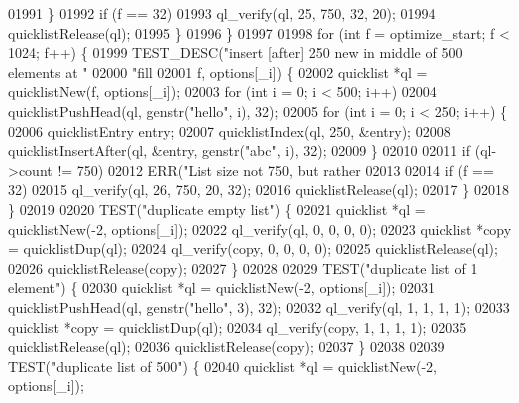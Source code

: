 \begin{DoxyCode}
{{{{{{{{{{{{{{{{{{{{{{{{{{{{{{{{{{{{{{{{{{{{{{{{{{{{{{{{{{01991                 \}
01992                 \textcolor{keywordflow}{if} (f == 32)
01993                     ql\_verify(ql, 25, 750, 32, 20);
01994                 quicklistRelease(ql);
01995             \}
01996         \}
01997 
01998         \textcolor{keywordflow}{for} (\textcolor{keywordtype}{int} f = optimize\_start; f < 1024; f++) \{
01999             TEST\_DESC(\textcolor{stringliteral}{"insert [after] 250 new in middle of 500 elements at "}
02000                       \textcolor{stringliteral}{"fill %
02001                       f, options[\_i]) \{
02002                 quicklist *ql = quicklistNew(f, options[\_i]);
02003                 \textcolor{keywordflow}{for} (\textcolor{keywordtype}{int} i = 0; i < 500; i++)
02004                     quicklistPushHead(ql, genstr(\textcolor{stringliteral}{"hello"}, i), 32);
02005                 \textcolor{keywordflow}{for} (\textcolor{keywordtype}{int} i = 0; i < 250; i++) \{
02006                     quicklistEntry entry;
02007                     quicklistIndex(ql, 250, &entry);
02008                     quicklistInsertAfter(ql, &entry, genstr(\textcolor{stringliteral}{"abc"}, i), 32);
02009                 \}
02010 
02011                 \textcolor{keywordflow}{if} (ql->count != 750)
02012                     ERR(\textcolor{stringliteral}{"List size not 750, but rather %
02013 
02014                 \textcolor{keywordflow}{if} (f == 32)
02015                     ql\_verify(ql, 26, 750, 20, 32);
02016                 quicklistRelease(ql);
02017             \}
02018         \}
02019 
02020         TEST(\textcolor{stringliteral}{"duplicate empty list"}) \{
02021             quicklist *ql = quicklistNew(-2, options[\_i]);
02022             ql\_verify(ql, 0, 0, 0, 0);
02023             quicklist *copy = quicklistDup(ql);
02024             ql\_verify(copy, 0, 0, 0, 0);
02025             quicklistRelease(ql);
02026             quicklistRelease(copy);
02027         \}
02028 
02029         TEST(\textcolor{stringliteral}{"duplicate list of 1 element"}) \{
02030             quicklist *ql = quicklistNew(-2, options[\_i]);
02031             quicklistPushHead(ql, genstr(\textcolor{stringliteral}{"hello"}, 3), 32);
02032             ql\_verify(ql, 1, 1, 1, 1);
02033             quicklist *copy = quicklistDup(ql);
02034             ql\_verify(copy, 1, 1, 1, 1);
02035             quicklistRelease(ql);
02036             quicklistRelease(copy);
02037         \}
02038 
02039         TEST(\textcolor{stringliteral}{"duplicate list of 500"}) \{
02040             quicklist *ql = quicklistNew(-2, options[\_i]);
}}}}}}}}}}}}}}}}}}}}}}}}}}}}}}}}}}}}}}}}}}}}}}}}}}}}}}}}}}}}
\end{DoxyCode}
